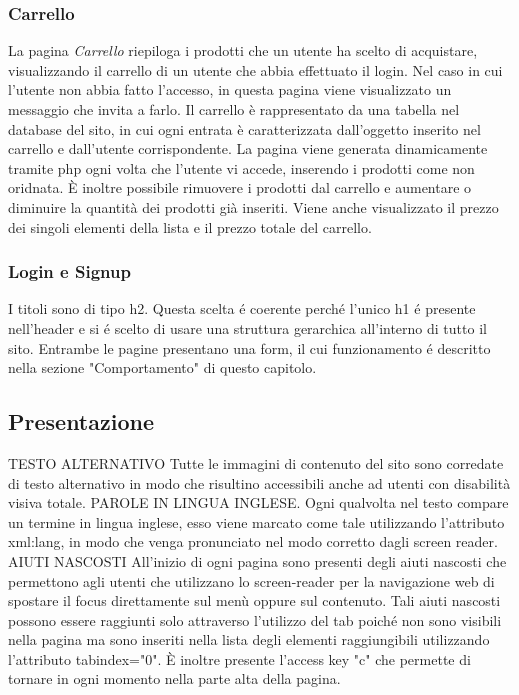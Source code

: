 		\subsubsection{Carrello}
			La pagina \emph{Carrello} riepiloga i prodotti che un utente ha scelto di acquistare, visualizzando il carrello di un utente che abbia effettuato il login.
			Nel caso in cui l'utente non abbia fatto l'accesso, in questa pagina viene visualizzato un messaggio che invita a farlo.
			Il carrello è rappresentato da una tabella nel database del sito, in cui ogni entrata è caratterizzata dall'oggetto inserito nel carrello e dall'utente corrispondente. La pagina viene generata dinamicamente tramite php ogni volta che l'utente vi accede, inserendo i prodotti come non oridnata. È inoltre possibile rimuovere i prodotti dal carrello e aumentare o diminuire la quantità dei prodotti già inseriti.
			Viene anche visualizzato il prezzo dei singoli elementi della lista e il prezzo totale del carrello.
		\subsubsection{Login e Signup}
			I titoli sono di tipo h2.
			Questa scelta \'e coerente  perch\'e l'unico h1 \'e presente nell'header e si \'e scelto di usare una struttura gerarchica all'interno di tutto il sito.
			Entrambe le pagine presentano una form, il cui funzionamento \'e descritto nella sezione "Comportamento" di questo capitolo.
    \subsection{Presentazione}
		TESTO ALTERNATIVO
		Tutte le immagini di contenuto del sito sono corredate di testo alternativo in modo che risultino accessibili anche ad utenti con disabilità visiva totale.
		PAROLE IN LINGUA INGLESE.
		Ogni qualvolta nel testo compare un termine in lingua inglese, esso viene marcato come tale utilizzando l'attributo xml:lang, in modo che venga pronunciato nel modo corretto dagli screen reader.
		AIUTI NASCOSTI
		All'inizio di ogni pagina sono presenti degli aiuti nascosti che permettono agli utenti che utilizzano lo screen-reader per la navigazione web di spostare il focus direttamente sul menù oppure sul contenuto.
		Tali aiuti nascosti possono essere raggiunti solo attraverso l'utilizzo del tab poiché non sono visibili nella pagina ma sono inseriti nella lista degli elementi raggiungibili utilizzando l'attributo tabindex="0".
		È inoltre presente l'access key "c" che permette di tornare in ogni momento nella parte alta della pagina.

